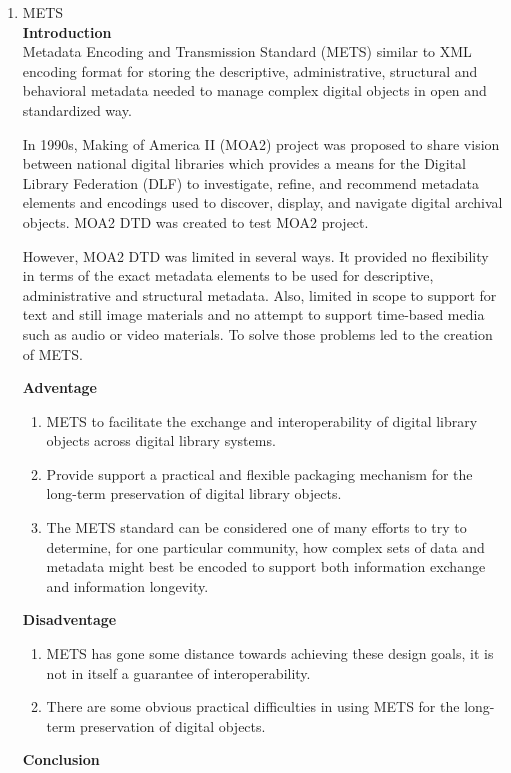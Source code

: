 \documentclass[a4paper]{article} %
\begin{document}
\begin{enumerate}
	\item METS\\
	{\bf Introduction}\\
	Metadata Encoding and Transmission Standard (METS) similar to XML encoding format for storing the descriptive, administrative, structural and behavioral metadata needed to manage complex digital objects in open and standardized way.
	
	In 1990s, Making of America II (MOA2) project was proposed to share vision between national digital libraries which provides a means for the Digital Library Federation (DLF) to investigate, refine, and recommend metadata elements and encodings used to discover, display, and navigate digital archival objects. MOA2 DTD was created to test MOA2 project.
	
	However, MOA2 DTD was limited in several ways. It provided no flexibility in terms of the exact metadata elements to be used for descriptive, administrative and structural metadata. Also, limited in scope to support for text and still image materials and no attempt to support time-based media such as audio or video materials. To solve those problems led to the creation of METS.
	
	{\bf Adventage}
	\begin{enumerate}
		\item METS to facilitate the exchange and interoperability of digital library objects across digital library systems.
		\item Provide support a practical and flexible packaging mechanism for the long-term preservation of digital library objects.
		\item The METS standard can be considered one of many efforts to try to determine, for one particular community, how complex sets of data and metadata might best be encoded to support both information exchange and information longevity.
	\end{enumerate}	
	{\bf Disadventage}
	\begin{enumerate}
		\item METS has gone some distance towards achieving these design goals, it is not in itself a guarantee of interoperability.
		\item There are some obvious practical difficulties in using METS for the long-term preservation of digital objects.
	\end{enumerate}
	{\bf Conclusion}\\	
	

\end{enumerate}
\end{document}
